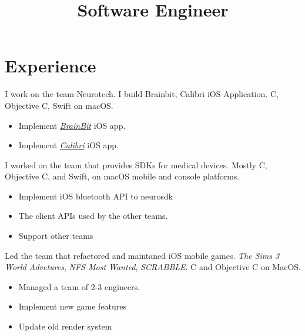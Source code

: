 \documentclass[11pt,letterpaper,sans]{moderncv}        %
\title{Software Engineer}                               %
\def\cplusplus{C\raisebox{0.4ex}{\tiny\textbf{++}}}
\begin{document}
\makecvtitle

\section{Experience}
{
I work on the team Neurotech. I build Brainbit, Calibri iOS Application. \cplusplus{}, Objective C, Swift on macOS.\newline{}%
\begin{itemize}
\item Implement \href{https://apps.apple.com/us/app/brainbit-app/id1510548623}{\textit{BrainBit}} iOS app.
\item Implement \href{https://apps.apple.com/ru/app/motion-assistant/id1269581635}{\textit{Calibri}} iOS app.
\end{itemize}
\hfill{ }\newline{}
}

{
I worked on the team that provides SDKs for medical devices. Mostly \cplusplus{}, Objective C, and Swift, on macOS mobile and console platforms.
\newline{}%
\begin{itemize}
\item Implement iOS bluetooth API to neurosdk
\item The client APIs used by the other teams.
\item Support other teams 
\end{itemize}
\hfill{ }\newline{}
}

{
Led the team that refactored and maintaned iOS mobile games. \textit{The Sims 3 World Advetures}, \textit{NFS Most Wanted}, \textit{SCRABBLE}. \cplusplus{} and Objective C on MacOS.\newline{}
\begin{itemize}
\item Managed a team of 2-3
 engineers.
\item Implement new game features
\item Update old render system
\end{itemize}
}
\end{document}
